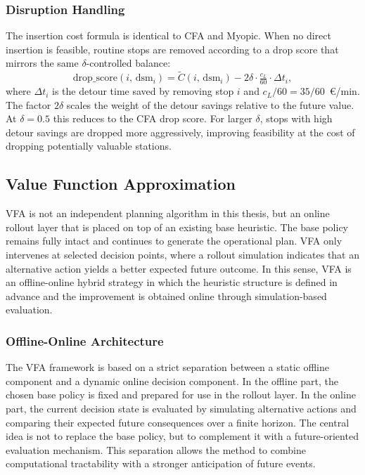 \documentclass[12pt,oneside]{article}
\begin{document}
\subsubsection*{Disruption Handling}
The insertion cost formula is identical to CFA and Myopic. When no direct insertion is feasible, routine stops are removed according to a drop score that mirrors the same $\delta$-controlled balance:
\[
  \text{drop\_score}(i,\, \mathrm{dsm}_i) = \tilde{C}(i,\, \mathrm{dsm}_i) - 2\delta \cdot \tfrac{c_L}{60} \cdot \Delta t_i,
\]
where $\Delta t_i$ is the detour time saved by removing stop $i$ and $c_L/60 = 35/60$~€/min. The factor $2\delta$ scales the weight of the detour savings relative to the future value. At $\delta = 0.5$ this reduces to the CFA drop score. For larger $\delta$, stops with high detour savings are dropped more aggressively, improving feasibility at the cost of dropping potentially valuable stations.

\subsection{Value Function Approximation}\label{subsec_value_function_approximation}
VFA is not an independent planning algorithm in this thesis, but an online rollout layer that is placed on top of an existing base heuristic. The base policy remains fully intact and continues to generate the operational plan. VFA only intervenes at selected decision points, where a rollout simulation indicates that an alternative action yields a better expected future outcome. In this sense, VFA is an offline-online hybrid strategy in which the heuristic structure is defined in advance and the improvement is obtained online through simulation-based evaluation.

\subsubsection*{Offline-Online Architecture}
The VFA framework is based on a strict separation between a static offline component and a dynamic online decision component. In the offline part, the chosen base policy is fixed and prepared for use in the rollout layer. In the online part, the current decision state is evaluated by simulating alternative actions and comparing their expected future consequences over a finite horizon. The central idea is not to replace the base policy, but to complement it with a future-oriented evaluation mechanism. This separation allows the method to combine computational tractability with a stronger anticipation of future events.
\end{document}
